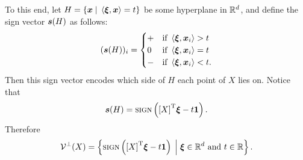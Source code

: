                 To this end, let \(H=\setb{\ve x}{\ip{\ve\xi}{\ve x}=t}\) be some hyperplane in \(\mathbb{R}^{d}\), and define the sign vector \(\bm{s}(H)\) as follows:
                    \begin{align*}
                        (\bm{s}(H))_i
                            =
                                \begin{cases}
                                    +   &\text{if } \left\langle\bm{\xi},\bm{x}_i\right\rangle>t\\
                                    0   &\text{if } \left\langle\bm{\xi},\bm{x}_i\right\rangle=t\\
                                    -   &\text{if } \left\langle\bm{\xi},\bm{x}_i\right\rangle<t.
                                \end{cases}
                    \end{align*}
                Then this sign vector encodes which side of \(H\) each point of \(X\) lies on.  Notice that
                    \begin{align*}
                        \bm{s}(H)=\operatorname{{\textsc{sign}}}\left({[X]}^{\mathrm{T}}\bm{\xi}-t\bm{1}\right).
                    \end{align*}
                Therefore
                    \[
                        \mc V^\perp(X)
                            =
                                \setb{\sgn\left(\Tr{[X]}\ve\xi-t\ve1\right)}{\ve\xi\in\R d\text{ and }t\in\RR}.
                    \]
